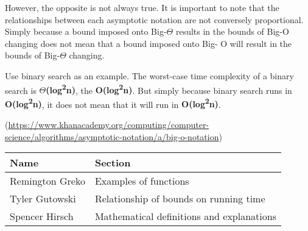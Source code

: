 \documentclass{article}
\begin{document}
	However, the opposite is not always true. It is important to note that the relationships between 
     each asymptotic notation are not conversely proportional. Simply because a bound imposed onto 
     Big-$\Theta$ results in the bounds of Big-O changing does not mean that a bound imposed onto Big-
     O will result in the bounds of Big-$\Theta$ changing.
	\smallskip

	Use binary search as an example. The worst-case time complexity of a binary search is \textbf{$
     \Theta$(log\textsuperscript{2}n)}, the \textbf{O(log\textsuperscript{2}n)}. But simply because 
     binary search runs in \textbf{O(log\textsuperscript{2}n)}, it does not mean that it will run in 
     \textbf{O(log\textsuperscript{2}n)}.	
	\smallskip

	(\url{https://www.khanacademy.org/computing/computer-science/algorithms/asymptotic-notation/a/big-o-notation})

	\smallskip

\pagebreak

\begin{center}
    \begin{tabular}{|p{3cm}|p{6cm}|}
        \hline
        \textbf{Name} & \textbf{Section} \\
        \hline
        Remington Greko &  Examples of functions\\
        \hline
        Tyler Gutowski &  Relationship of bounds on running time\\
        \hline
        Spencer Hirsch & Mathematical definitions and explanations \\
        \hline
    \end{tabular}
\end{center}
\end{document}
